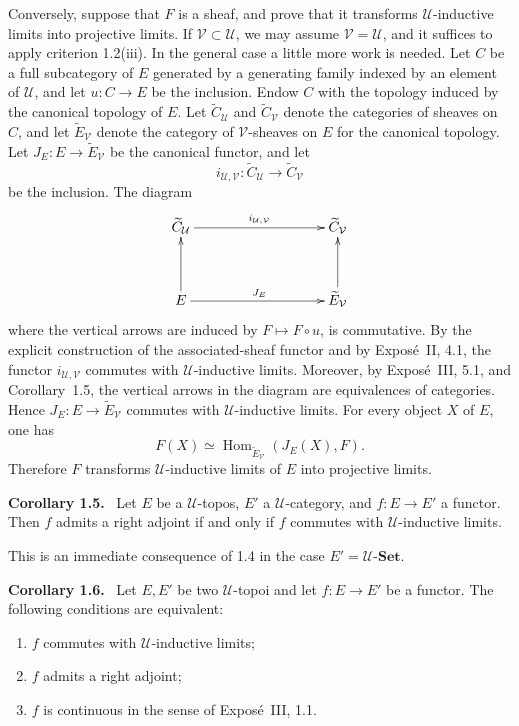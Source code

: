 \documentclass[11pt]{article}
\newcommand{\U}{\mathcal{U}}
\newcommand{\V}{\mathcal{V}}
\newcommand{\Set}{\mathbf{Set}}
\newcommand{\Hom}{\operatorname{Hom}}
\newenvironment{statement}[1]{\par\medskip\noindent\textbf{#1.}\ }{\par\medskip}
\begin{document}
Conversely, suppose that \(F\) is a sheaf, and prove that it transforms \(\U\)-inductive limits into projective limits. If \(\V\subset\U\), we may assume \(\V=\U\), and it suffices to apply criterion 1.2(iii). In the general case a little more work is needed. Let \(C\) be a full subcategory of \(E\) generated by a generating family indexed by an element of \(\U\), and let \(u:C\to E\) be the inclusion. Endow \(C\) with the topology induced by the canonical topology of \(E\). Let \(\widetilde C_{\U}\) and \(\widetilde C_{\V}\) denote the categories of sheaves on \(C\), and let \(\widetilde E_{\V}\) denote the category of \(\V\)-sheaves on \(E\) for the canonical topology. Let \(J_E:E\to\widetilde E_{\V}\) be the canonical functor, and let
\[
i_{\U,\V}:\widetilde C_{\U}\longrightarrow \widetilde C_{\V}
\]
be the inclusion. The diagram
\[
\xymatrix@C=3.25cm@R=1.25cm{
\widetilde C_{\U} \ar[r]^{i_{\U,\V}} & \widetilde C_{\V}\cr
E \ar[r]^{J_E} \ar[u] & \widetilde E_{\V}\ar[u]
}
\]
where the vertical arrows are induced by \(F\mapsto F\circ u\), is commutative. By the explicit construction of the associated-sheaf functor and by Expos\'e~II, 4.1, the functor \(i_{\U,\V}\) commutes with \(\U\)-inductive limits. Moreover, by Expos\'e~III, 5.1, and Corollary~1.5, the vertical arrows in the diagram are equivalences of categories. Hence \(J_E:E\to\widetilde E_{\V}\) commutes with \(\U\)-inductive limits. For every object \(X\) of \(E\), one has
\[
F(X)\simeq \Hom_{\widetilde E_{\V}}(J_E(X),F).
\]
Therefore \(F\) transforms \(\U\)-inductive limits of \(E\) into projective limits.

\begin{statement}{Corollary 1.5}
Let \(E\) be a \(\U\)-topos, \(E'\) a \(\U\)-category, and \(f:E\to E'\) a functor. Then \(f\) admits a right adjoint if and only if \(f\) commutes with \(\U\)-inductive limits.
\end{statement}
This is an immediate consequence of 1.4 in the case \(E'=\U\text{-}\Set\).

\begin{statement}{Corollary 1.6}
Let \(E,E'\) be two \(\U\)-topoi and let \(f:E\to E'\) be a functor. The following conditions are equivalent:
\begin{enumerate}[label=\roman*)]
\item \(f\) commutes with \(\U\)-inductive limits;
\item \(f\) admits a right adjoint;
\item \(f\) is continuous in the sense of Expos\'e~III, 1.1.
\end{enumerate}
\end{statement}
\end{document}
